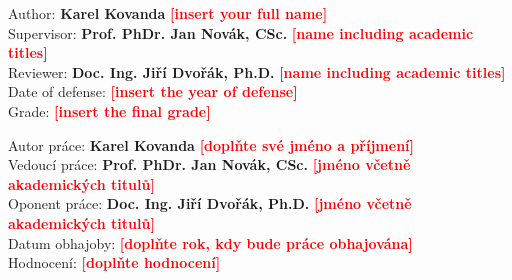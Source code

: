 \vglue 16cm

\noindent \large{Author: \textbf{Karel Kovanda }}\normalsize{\textbf{\textcolor{red}{[insert your full name]}}}\\
\noindent \large{Supervisor: \textbf{Prof. PhDr. Jan Novák, CSc. }}\normalsize{\textbf{\textcolor{red}{[name including academic titles]}}}\\
\noindent \large{Reviewer: \textbf{Doc. Ing. Jiří Dvořák, Ph.D. }}\normalsize{\textbf{\textcolor{red}{[name including academic titles]}}}\\
\noindent \large{Date of defense:}
\normalsize{\textbf{\textcolor{red}{[insert the year of defense]}}}\\
\newline
\noindent \large{Grade:} \normalsize{\textbf{\textcolor{red}{[insert the final grade]}}}\\

\newpage

\pagestyle{empty}

\vfill

\vglue 16cm

\noindent \large{Autor práce: \textbf{Karel Kovanda }}\normalsize{\textbf{\textcolor{red}{[doplňte své jméno a příjmení]}}}\\
\noindent \large{Vedoucí práce: \textbf{Prof. PhDr. Jan Novák, CSc. }}\normalsize{\textbf{\textcolor{red}{[jméno včetně akademických titulů]}}}\\
\noindent \large{Oponent práce: \textbf{Doc. Ing. Jiří Dvořák, Ph.D. }}\normalsize{\textbf{\textcolor{red}{[jméno včetně akademických titulů]}}}\\
\noindent \large{Datum obhajoby:}
\normalsize{\textbf{\textcolor{red}{[doplňte rok, kdy bude práce obhajována]}}}\\
\newline
\noindent \large{Hodnocení:} \normalsize{\textbf{\textcolor{red}{[doplňte hodnocení]}}}\\

